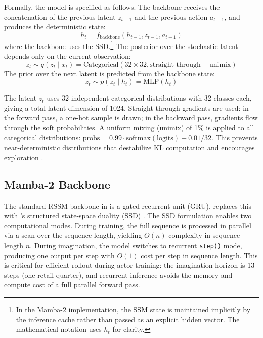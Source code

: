 Formally, the model is specified as follows. The backbone receives the concatenation of the previous latent $z_{t-1}$ and the previous action $a_{t-1}$, and produces the deterministic state:
\begin{equation}
h_t = f_{\text{backbone}}(h_{t-1}, z_{t-1}, a_{t-1})
\end{equation}
where the backbone uses the \mamba{} SSD.\footnote{In the Mamba-2 implementation, the SSM state is maintained implicitly by the inference cache rather than passed as an explicit hidden vector. The mathematical notation uses $h_t$ for clarity.}
The posterior over the stochastic latent depends only on the current observation:
\begin{equation}
z_t \sim q(z_t \mid x_t) = \text{Categorical}(32 \times 32, \text{straight-through} + \text{unimix})
\end{equation}
The prior over the next latent is predicted from the backbone state:
\begin{equation}
\hat{z}_t \sim p(z_t \mid h_t) = \text{MLP}(h_t)
\end{equation}

The latent $z_t$ uses 32 independent categorical distributions with 32 classes each, giving a total latent dimension of 1024. Straight-through gradients \citep{jang2017gumbel} are used: in the forward pass, a one-hot sample is drawn; in the backward pass, gradients flow through the soft probabilities. A uniform mixing (unimix) of 1\% is applied to all categorical distributions: $\text{probs} = 0.99 \cdot \text{softmax}(\text{logits}) + 0.01/32$. This prevents near-deterministic distributions that destabilize KL computation and encourages exploration \citep{hafner2023dreamerv3}.

\subsection{Mamba-2 Backbone}

The standard RSSM backbone in \dreamer{} is a gated recurrent unit (GRU). \dreamprice{} replaces this with \mamba{}'s structured state-space duality (SSD) \citep{dao2024mamba2, gu2024mamba}. The SSD formulation enables two computational modes. During training, the full sequence is processed in parallel via a scan over the sequence length, yielding $O(n)$ complexity in sequence length $n$. During imagination, the model switches to recurrent \texttt{step()} mode, producing one output per step with $O(1)$ cost per step in sequence length. This is critical for efficient rollout during actor training: the imagination horizon is 13 steps (one retail quarter), and recurrent inference avoids the memory and compute cost of a full parallel forward pass.


